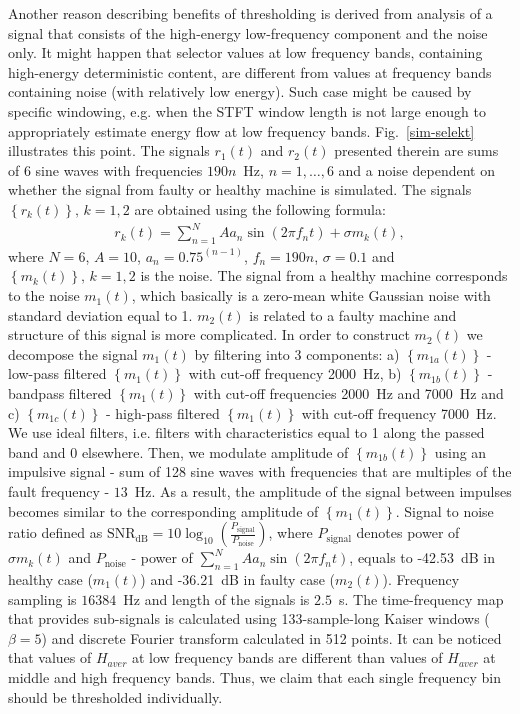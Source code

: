 \documentclass[11pt]{article} %
\begin{document}
Another reason describing benefits of thresholding is derived from analysis of a signal that consists of the high-energy low-frequency component and the noise only. It might happen that selector values at low frequency bands, containing high-energy  deterministic content, are different from values at frequency bands containing noise (with relatively low energy). Such case might be caused by specific windowing, e.g. when the STFT window length is not large enough to appropriately estimate energy flow at low frequency bands. Fig.~\ref{sim-selekt} illustrates this point. The signals $r_1(t)$ and $r_2(t)$ presented therein are sums of 6 sine waves with frequencies $190n$~Hz, $n=1,\ldots,6$ and a noise dependent on whether the signal from faulty or healthy machine is simulated. The signals $\left\{r_k(t)\right\},\,k=1,2$ are obtained using the following formula:
\begin{eqnarray}
r_k(t)=\sum^{N}_{n=1}{ A a_n \sin(2\pi f_n t)} + \sigma m_k(t),
\end{eqnarray}
where $N=6$, $A=10$, $a_n=0.75^{(n-1)}$, $f_n=190n$, $\sigma=0.1$ and $\left\{m_k(t)\right\},\,k=1,2$ is the noise. The signal from a healthy machine corresponds to the noise $m_1(t)$, which basically is a zero-mean white Gaussian noise with standard deviation equal to 1. $m_2(t)$ is related to a faulty machine and structure of this signal is more complicated. In order to construct $m_2(t)$ we decompose the signal $m_1(t)$ by filtering into 3 components: a) $\left\{m_{1a}(t)\right\}$ - low-pass filtered $\left\{m_1(t)\right\}$ with cut-off frequency 2000~Hz, b) $\left\{m_{1b}(t)\right\}$ - bandpass filtered $\left\{m_1(t)\right\}$ with cut-off frequencies 2000~Hz and 7000~Hz and c) $\left\{m_{1c}(t)\right\}$ - high-pass filtered $\left\{m_1(t)\right\}$ with cut-off frequency 7000~Hz. We use ideal filters, i.e. filters with characteristics equal to 1 along the passed band and 0 elsewhere. Then, we modulate amplitude of $\left\{m_{1b}(t)\right\}$ using an impulsive signal - sum of 128 sine waves with frequencies that are multiples of the fault frequency - $13$~Hz. As a result, the amplitude of the signal between impulses becomes similar to the corresponding amplitude of $\left\{m_1(t)\right\}$. Signal to noise ratio defined as $\mathrm{SNR_{dB}} = 10 \log_{10} \left ( \frac{P_\mathrm{signal}}{P_\mathrm{noise}} \right )$, where $P_\mathrm{signal}$ denotes power of $\sigma m_k(t)$ and $P_\mathrm{noise}$ - power of $\sum^{N}_{n=1}{ A a_n \sin(2\pi f_n t)}$, equals to -42.53~dB in healthy case ($m_1(t)$) and -36.21~dB in faulty case ($m_2(t)$). Frequency sampling is $16384$~Hz and length of the signals is $2.5$~s. The time-frequency map that provides sub-signals is calculated using 133-sample-long Kaiser windows ($\beta=5$) and discrete Fourier transform calculated in 512 points. It can be noticed that values of $H_{aver}$ at low frequency bands are different than values of $H_{aver}$ at middle and high frequency bands. Thus, we claim that each single frequency bin should be thresholded individually.\\
\end{document}
